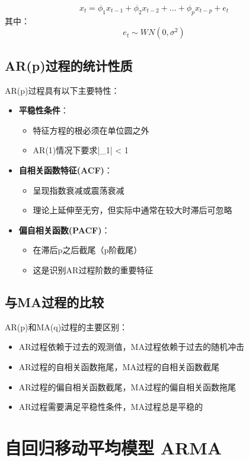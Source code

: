 \[x_t = \phi_1x_{t-1} + \phi_2x_{t-2} + ... + \phi_px_{t-p} + e_t\]
其中：\[e_t \sim WN(0,\sigma^2)\]

\subsection{AR(p)过程的统计性质}
AR(p)过程具有以下主要特性：
\begin{itemize}
    \item \textbf{平稳性条件}：
        \begin{itemize}
            \item 特征方程的根必须在单位圆之外
            \item AR(1)情况下要求|\phi_1| < 1
        \end{itemize}
    \item \textbf{自相关函数特征(ACF)}：
        \begin{itemize}
            \item 呈现指数衰减或震荡衰减
            \item 理论上延伸至无穷，但实际中通常在较大时滞后可忽略
        \end{itemize}
    \item \textbf{偏自相关函数(PACF)}：
        \begin{itemize}
            \item 在滞后p之后截尾（p阶截尾）
            \item 这是识别AR过程阶数的重要特征
        \end{itemize}
\end{itemize}

\subsection{与MA过程的比较}
AR(p)和MA(q)过程的主要区别：
\begin{itemize}
    \item AR过程依赖于过去的观测值，MA过程依赖于过去的随机冲击
    \item AR过程的自相关函数拖尾，MA过程的自相关函数截尾
    \item AR过程的偏自相关函数截尾，MA过程的偏自相关函数拖尾
    \item AR过程需要满足平稳性条件，MA过程总是平稳的
\end{itemize}




\section{自回归移动平均模型 ARMA}
